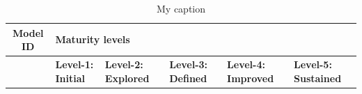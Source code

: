 \documentclass[a4paper,oneside]{bth}
\begin{document}
\begin{table}[h]
\centering
\caption{My caption}
\label{my-label}
\begin{tabular}{|c|p{1.5cm}|p{2cm}|p{2.1cm}|p{2cm}|p{2cm}|}
\hline
\textbf{Model ID} & \multicolumn{5}{l|}{\textbf{Maturity levels}}        \\ \hline
                  & \textbf{Level-1: Initial} & \textbf{Level-2: Explored}                                                                                                               & \textbf{Level-3: Defined}                                                                                                                                                                                                 & \textbf{Level-4: Improved}                                                                                                                     & \textbf{Level-5: Sustained}                                                                                            \\ \hline

\end{tabular}
\end{table}
\end{document}
